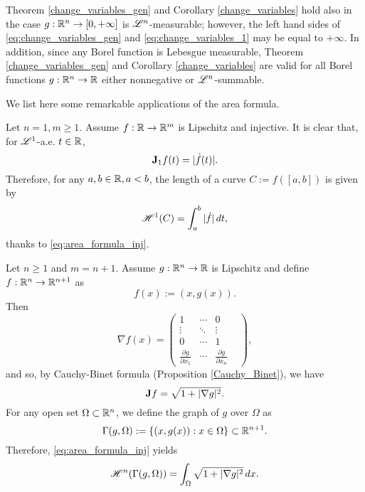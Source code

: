 \begin{remark}
Theorem \ref{change_variables_gen} and Corollary \ref{change_variables} hold also in the case $g : \mathbb{R}^{n} \to [0, + \infty]$ is $\mathscr{L}^{n}$-measurable; however, the left hand sides of \eqref{eq:change_variables_gen} and \eqref{eq:change_variables_1} may be equal to $+ \infty$.
In addition, since any Borel function is Lebesgue measurable, Theorem \ref{change_variables_gen} and Corollary \ref{change_variables} are valid for all Borel functions $g : \mathbb{R}^{n} \to \mathbb{R}$ either nonnegative or $\mathscr{L}^{n}$-summable.
\end{remark}

We list here some remarkable applications of the area formula.

\begin{example}
Let $n = 1, m \ge 1$. Assume $f : \mathbb{R} \to \mathbb{R}^{m}$ is Lipschitz and injective. It is clear that, for $\mathscr{L}^{1}$-a.e. $t \in \mathbb{R}$,
\begin{equation*}
{\bf J}_{1} f(t) = |\dot{f}(t)|. 
\end{equation*}
Therefore, for any $a, b \in \mathbb{R}, a < b$, the length of a curve $C := f([a, b])$ is given by
\begin{equation*}
\mathscr{H}^{1}(C) = \int_{a}^{b} |\dot{f}| \, dt,
\end{equation*}
thanks to \eqref{eq:area_formula_inj}.
\end{example}

\begin{example}
Let $n \ge 1$ and $m = n + 1$. Assume $g: \mathbb{R}^{n} \to \mathbb{R}$ is Lipschitz and define $f: \mathbb{R}^{n} \to \mathbb{R}^{n + 1}$ as $$f(x) := (x, g(x)).$$
Then
\[\nabla f(x) = \begin{pmatrix} 1 & \cdots & 0 & \\ \vdots & \ddots & \vdots \\ 
0 & \cdots & 1 & \\ \frac{\partial g}{\partial x_{1}} & \cdots & \frac{\partial g}{\partial x_{n}} & \end{pmatrix},\]
and so, by Cauchy-Binet formula (Proposition \ref{Cauchy_Binet}), we have
\begin{equation*}
{\bf J} f = \sqrt{1 + |\nabla g|^2}.
\end{equation*}
For any open set $\Omega \subset \mathbb{R}^{n}$, we define the graph of $g$ over $\Omega$ as
$$ \Gamma(g, \Omega) := \{ (x, g(x)) : x \in \Omega \} \subset \mathbb{R}^{n + 1}.$$
Therefore, \eqref{eq:area_formula_inj} yields
\begin{equation*}
\mathscr{H}^{n}(\Gamma(g, \Omega)) = \int_{\Omega} \sqrt{1 + |\nabla g|^{2}} \, dx.
\end{equation*}
\end{example}

